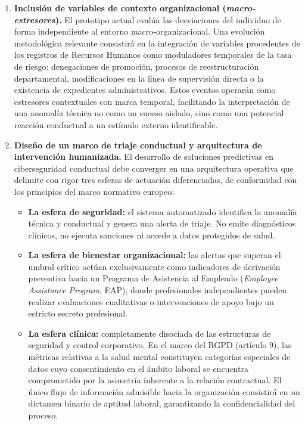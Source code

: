 \documentclass[IB]{TFUOC}%
\begin{document}
\begin{enumerate}
    \item \textbf{Inclusión de variables de contexto organizacional (\textit{macro-estresores}).}\newline
    El prototipo actual evalúa las desviaciones del individuo de forma independiente al entorno macro-organizacional. Una evolución metodológica relevante consistirá en la integración de variables procedentes de los registros de Recursos Humanos como moduladores temporales de la tasa de riesgo: denegaciones de promoción, procesos de reestructuración departamental, modificaciones en la línea de supervisión directa o la existencia de expedientes administrativos. Estos eventos operarán como estresores contextuales con marca temporal, facilitando la interpretación de una anomalía técnica no como un suceso aislado, sino como una potencial reacción conductual a un estímulo externo identificable.

    \item \textbf{Diseño de un marco de triaje conductual y arquitectura de intervención humanizada.}\newline
    El desarrollo de soluciones predictivas en ciberseguridad conductual debe converger en una arquitectura operativa que delimite con rigor tres esferas de actuación diferenciadas, de conformidad con los principios del marco normativo europeo:
    
    \begin{itemize}
        \item \textbf{La esfera de seguridad:} el sistema automatizado identifica la anomalía técnica y conductual y genera una alerta de triaje. No emite diagnósticos clínicos, no ejecuta sanciones ni accede a datos protegidos de salud.
        
        \item \textbf{La esfera de bienestar organizacional:} las alertas que superan el umbral crítico actúan exclusivamente como indicadores de derivación preventiva hacia un Programa de Asistencia al Empleado (\textit{Employee Assistance Program}, EAP), donde profesionales independientes pueden realizar evaluaciones cualitativas o intervenciones de apoyo bajo un estricto secreto profesional.
        
        \item \textbf{La esfera clínica:} completamente disociada de las estructuras de seguridad y control corporativo. En el marco del RGPD (artículo 9), las métricas relativas a la salud mental constituyen categorías especiales de datos cuyo consentimiento en el ámbito laboral se encuentra comprometido por la asimetría inherente a la relación contractual. El único flujo de información admisible hacia la organización consistirá en un dictamen binario de aptitud laboral, garantizando la confidencialidad del proceso.
    \end{itemize}
    

\end{enumerate}
\end{document}
